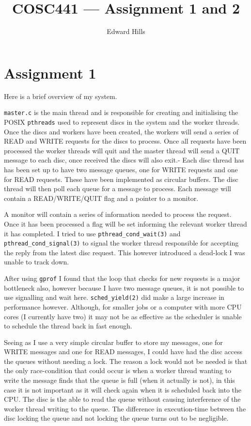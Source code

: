 \documentclass[12pt]{article}
\title{COSC441 --- Assignment 1 and 2}
\author{Edward Hills}
\date{}
\begin{document}
\vspace{-1cm}

\maketitle

\section*{Assignment 1}

Here is a brief overview of my system.

\texttt{master.c} is the main thread and is responsible for creating and initialising the POSIX \texttt{pthreads} used to represent discs in the system and the worker threads. Once the discs and workers have been created, the workers will send a series of READ and WRITE requests for the discs to process. Once all requests have been processed the worker threads will quit and the master thread will send a QUIT message to each disc, once received the discs will also exit.-
Each disc thread has has been set up to have two message queues, one for WRITE requests and one for READ requests. These have been implemented as circular buffers. The disc thread will then poll each queue for a message to process. Each message will contain a READ/WRITE/QUIT flag and a pointer to a monitor.

A monitor will contain a series of information needed to process the request. Once it has been processed a flag will be set informing the relevant worker thread it has completed. I tried to use \texttt{pthread\_cond\_wait(3)} and \texttt{pthread\_cond\_signal(3)} to signal the worker thread responsible for accepting the reply from the latest disc request. This however introduced a dead-lock I was unable to track down.

After using \texttt{gprof} I found that the loop that checks for new requests is a major bottleneck also, however because I have two message queues, it is not possible to use signalling and wait here. \texttt{sched\_yield(2)} did make a large increase in performance however. Although, for smaller jobs or a computer with more CPU cores (I currently have two) it may not be as effective as the scheduler is unable to schedule the thread back in fast enough.

Seeing as I use a very simple circular buffer to store my messages, one for WRITE messages and one for READ messages, I could have had the disc access the queues without needing a lock. The reason a lock would not be needed is that the only race-condition that could occur is when a worker thread wanting to write the message finds that the queue is full (when it actually is not), in this case it is not important as it will check again when it is scheduled back into the CPU. The disc is the able to read the queue without causing interference of the worker thread writing to the queue. The difference in execution-time between the disc locking the queue and not locking the queue turns out to be negligible.
\end{document}
